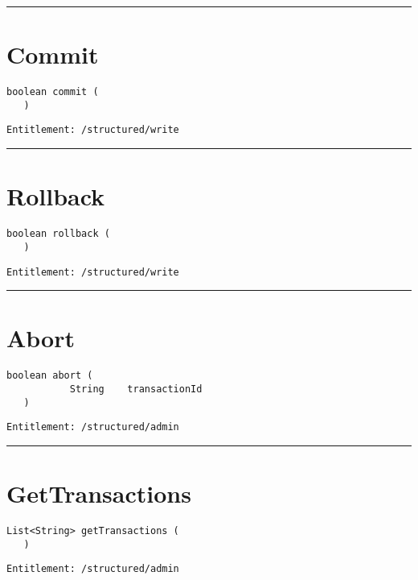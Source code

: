\rule{12cm}{2pt}
\section{Commit}
\label{Api:Commit}
\begin{lstlisting}[style=nonumbers]
   boolean commit (
   )
\end{lstlisting}
\begin{Verbatim}[formatcom=\color{Maroon}]
  Entitlement: /structured/write
\end{Verbatim}



\rule{12cm}{2pt}
\section{Rollback}
\label{Api:Rollback}
\begin{lstlisting}[style=nonumbers]
   boolean rollback (
   )
\end{lstlisting}
\begin{Verbatim}[formatcom=\color{Maroon}]
  Entitlement: /structured/write
\end{Verbatim}



\rule{12cm}{2pt}
\section{Abort}
\label{Api:Abort}
\begin{lstlisting}[style=nonumbers]
   boolean abort (
           String    transactionId
   )
\end{lstlisting}
\begin{Verbatim}[formatcom=\color{Maroon}]
  Entitlement: /structured/admin
\end{Verbatim}



\rule{12cm}{2pt}
\section{GetTransactions}
\label{Api:GetTransactions}
\begin{lstlisting}[style=nonumbers]
   List<String> getTransactions (
   )
\end{lstlisting}
\begin{Verbatim}[formatcom=\color{Maroon}]
  Entitlement: /structured/admin
\end{Verbatim}



